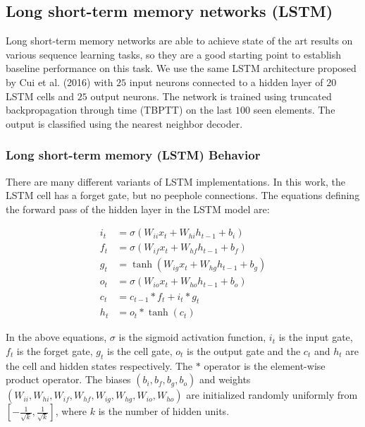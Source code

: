 \documentclass{article}
\begin{document}
\subsection*{Long short-term memory networks (LSTM)}

Long short-term memory \cite{hochreiter1997long} networks are able to achieve state of the art results on various sequence learning tasks, so they are a good starting point to establish baseline performance on this task. We use the same LSTM architecture proposed by Cui et al. (2016) with $25$ input neurons connected to a hidden layer of $20$ LSTM cells and $25$ output neurons. The network is trained using truncated backpropagation through time (TBPTT) \cite{mozer1995focused, sutskever2013training} on the last $100$ seen elements. The output is classified using the nearest neighbor decoder.

\subsubsection*{Long short-term memory (LSTM) Behavior}
There are many different variants of LSTM implementations. In this work, the LSTM cell has a forget gate, but no peephole connections. The equations defining the forward pass of the hidden layer in the LSTM model are:

\begin{align}
    i_t &= \sigma\left(W_{ii}x_t + W_{hi}h_{t-1} + b_i\right)\\
    f_t &= \sigma\left(W_{if}x_t + W_{hf}h_{t-1} + b_f\right)\\
    g_t &= \tanh\left(W_{ig}x_t + W_{hg}h_{t-1} + b_g\right)\\
    o_t &= \sigma\left(W_{io}x_t + W_{ho}h_{t-1} + b_o\right)\\
    c_t &= c_{t-1}\ast f_t + i_t \ast g_t\\
    h_t &= o_t \ast \tanh\left(c_t\right)
\end{align}

In the above equations, $\sigma$ is the sigmoid activation function, $i_t$ is the input gate, $f_t$ is the forget gate, $g_t$ is the cell gate, $o_t$ is the output gate and the $c_t$ and $h_t$ are the cell and hidden states respectively. The $\ast$ operator is the element-wise product operator. The biases $\left(b_i, b_f, b_g, b_o\right)$ and weights $\left(W_{ii}, W_{hi}, W_{if}, W_{hf}, W_{ig}, W_{hg},W_{io}, W_{ho}\right)$ are initialized randomly uniformly from $\left[-\frac{1}{\sqrt{k}}, \frac{1}{\sqrt{k}}\right]$, where $k$ is the number of hidden units. \cite{jozefowicz2015empirical} 
\end{document}
